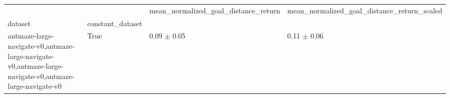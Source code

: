 \begin{tabular}{llll}
\toprule
 &  & mean_normalized_goal_distance_return & mean_normalized_goal_distance_return_scaled \\
dataset & constant_dataset &  &  \\
\midrule
antmaze-large-navigate-v0,antmaze-large-navigate-v0,antmaze-large-navigate-v0,antmaze-large-navigate-v0 & True & 0.09 $\pm$ 0.05 & 0.11 $\pm$ 0.06 \\
\cline{1-4}
\bottomrule
\end{tabular}
